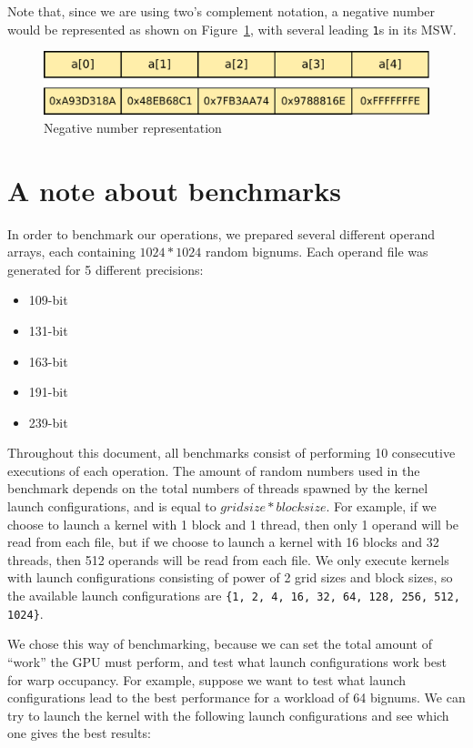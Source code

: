 \documentclass[12pt, a4paper]{report}
\begin{document}
\begin{sloppypar}
Note that, since we are using two's complement notation, a negative number would
be represented as shown on Figure~\ref{fig:negative_number_representation}, with
several leading \verb+1+s in its MSW.

\begin{figure}[h]
\centering
\includegraphics[scale=0.5]{figs/negative_number_representation}
\caption{Negative number representation}
\label{fig:negative_number_representation}
\end{figure}

\section{A note about benchmarks}
In order to benchmark our operations, we prepared several different operand arrays, each
containing $1024*1024$ random bignums.
Each operand file was generated for 5 different precisions:

\begin{itemize}
\item 109-bit
\item 131-bit
\item 163-bit
\item 191-bit
\item 239-bit
\end{itemize}

Throughout this document, all benchmarks consist of performing 10 consecutive
executions of each operation.
The amount of random numbers used in the benchmark depends on the total numbers
of threads spawned by the kernel launch configurations, and is equal to
$gridsize*blocksize$.
For example, if we choose to launch a kernel with 1 block and 1 thread, then
only 1 operand will be read from each file, but if we choose to launch a kernel
with 16 blocks and 32 threads, then 512 operands will be read from each file.
We only execute kernels with launch configurations consisting of power of 2
grid sizes and block sizes, so the available launch configurations are
\verb+{1, 2, 4, 16, 32, 64, 128, 256, 512, 1024}+.

We chose this way of benchmarking, because we can set the total amount of
``work'' the GPU must perform, and test what launch configurations work best for
warp occupancy.
For example, suppose we want to test what launch configurations lead to the best
performance for a workload of 64 bignums.
We can try to launch the kernel with the following launch configurations and see
which one gives the best results:


\end{sloppypar}
\end{document}
